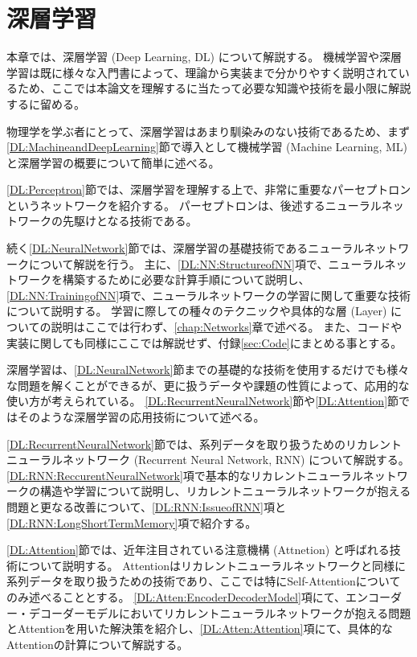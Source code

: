 
\chapter{深層学習} \label{chap:DeepLearning}

本章では、深層学習 (Deep Learning, DL) について解説する。
機械学習や深層学習は既に様々な入門書\cite{ZeroDeepLearning1, ZeroDeepLearning2, PythonMLPrograming}によって、理論から実装まで分かりやすく説明されているため、ここでは本論文を理解するに当たって必要な知識や技術を最小限に解説するに留める。

物理学を学ぶ者にとって、深層学習はあまり馴染みのない技術であるため、まず\ref{DL:MachineandDeepLearning}節で導入として機械学習 (Machine Learning, ML) と深層学習の概要について簡単に述べる。

\ref{DL:Perceptron}節では、深層学習を理解する上で、非常に重要なパーセプトロンというネットワークを紹介する。
パーセプトロンは、後述するニューラルネットワークの先駆けとなる技術である。

続く\ref{DL:NeuralNetwork}節では、深層学習の基礎技術であるニューラルネットワークについて解説を行う。
主に、\ref{DL:NN:StructureofNN}項で、ニューラルネットワークを構築するために必要な計算手順について説明し、\ref{DL:NN:TrainingofNN}項で、ニューラルネットワークの学習に関して重要な技術について説明する。
学習に際しての種々のテクニックや具体的な層 (Layer) についての説明はここでは行わず、\ref{chap:Networks}章で述べる。
また、コードや実装に関しても同様にここでは解説せず、付録\ref{sec:Code}にまとめる事とする。

深層学習は、\ref{DL:NeuralNetwork}節までの基礎的な技術を使用するだけでも様々な問題を解くことができるが、更に扱うデータや課題の性質によって、応用的な使い方が考えられている。
\ref{DL:RecurrentNeuralNetwork}節や\ref{DL:Attention}節ではそのような深層学習の応用技術について述べる。

\ref{DL:RecurrentNeuralNetwork}節では、系列データを取り扱うためのリカレントニューラルネットワーク (Recurrent Neural Network, RNN) について解説する。
\ref{DL:RNN:ReccurentNeuralNetwork}項で基本的なリカレントニューラルネットワークの構造や学習について説明し、リカレントニューラルネットワークが抱える問題と更なる改善について、\ref{DL:RNN:IssueofRNN}項と\ref{DL:RNN:LongShortTermMemory}項で紹介する。

\ref{DL:Attention}節では、近年注目されている注意機構 (Attnetion) と呼ばれる技術について説明する。
Attentionはリカレントニューラルネットワークと同様に系列データを取り扱うための技術であり、ここでは特にSelf-Attentionについてのみ述べることとする。
\ref{DL:Atten:EncoderDecoderModel}項にて、エンコーダー・デコーダーモデルにおいてリカレントニューラルネットワークが抱える問題とAttentionを用いた解決策を紹介し、\ref{DL:Atten:Attention}項にて、具体的なAttentionの計算について解説する。

